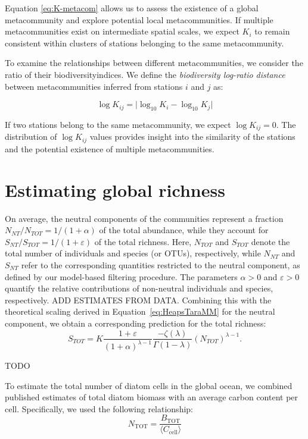 \documentclass[%
 preprint,            %
 superscriptaddress, %
 amsmath,amssymb,    %
 aps,                %
 pra,                %
 floatfix,           %
]{revtex4-2}
\begin{document}
Equation \eqref{eq:K-metacom} allows us to assess the existence of a global metacommunity and explore potential local metacommunities. If multiple metacommunities exist on intermediate spatial scales, we expect $K_i$ to remain consistent within clusters of stations belonging to the same metacommunity.

To examine the relationships between different metacommunities, we consider the ratio of their biodiversityindices. We define the \emph{biodiversity log-ratio distance} between metacommunities inferred from stations $i$ and $j$ as:

\begin{equation}
    \log K_{ij} = \lvert\log_{10}{K_i}-\log_{10}{K_j}\rvert
\end{equation}

If two stations belong to the same metacommunity, we expect $\log K_{ij} = 0$. The distribution of $\log K_{ij}$ values provides insight into the similarity of the stations and the potential existence of multiple metacommunities. 

\section{Estimating global richness}

On average, the neutral components of the communities represent a fraction $ N_{NT} / N_{TOT} = 1 / (1 + \alpha) $ of the total abundance, while they account for $ S_{NT} / S_{TOT} = 1 / (1 + \varepsilon) $ of the total richness. Here, $ N_{TOT} $ and $ S_{TOT} $ denote the total number of individuals and species (or OTUs), respectively, while $ N_{NT} $ and $ S_{NT} $ refer to the corresponding quantities restricted to the neutral component, as defined by our model-based filtering procedure. The parameters $ \alpha > 0 $ and $ \varepsilon > 0 $ quantify the relative contributions of non-neutral individuals and species, respectively. ADD ESTIMATES FROM DATA.
Combining this with the theoretical scaling derived in Equation~\eqref{eq:HeapsTaraMM} for the neutral component,
we obtain a corresponding prediction for the total richness:
\begin{equation}
    S_{TOT} = K \frac{1+\varepsilon}{(1+\alpha)^{\lambda-1}} \frac{-\zeta(\lambda)}{\Gamma(1-\lambda)}  (N_{TOT})^{\lambda -1}.
    \label{eq:global-heaps}
\end{equation}

TODO 

To estimate the total number of diatom cells in the global ocean, we combined published estimates of total diatom biomass with an average carbon content per cell. Specifically, we used the following relationship:
\begin{equation}
    N_{\mathrm{TOT}} = \frac{B_{\mathrm{TOT}}}{\langle C_{\mathrm{cell}} \rangle}
\end{equation}
\end{document}

